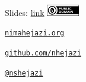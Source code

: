 \documentclass[12pt,t,handout]{beamer}
\begin{document}
\begin{frame}[c]{}

\Large
Slides: \href{http://bit.ly/biotmle2017_wnotes}{link} \quad
\includegraphics[height=5mm]{Figs/cc-zero.png}

\vspace{10mm}

\href{http://nimahejazi.org}{\tt nimahejazi.org}

\vspace{10mm}

\href{https://github.com/nhejazi}{\tt github.com/nhejazi}

\vspace{10mm}

\href{https://twitter.com/nshejazi}{\tt @nshejazi}


\end{frame}
\end{document}

